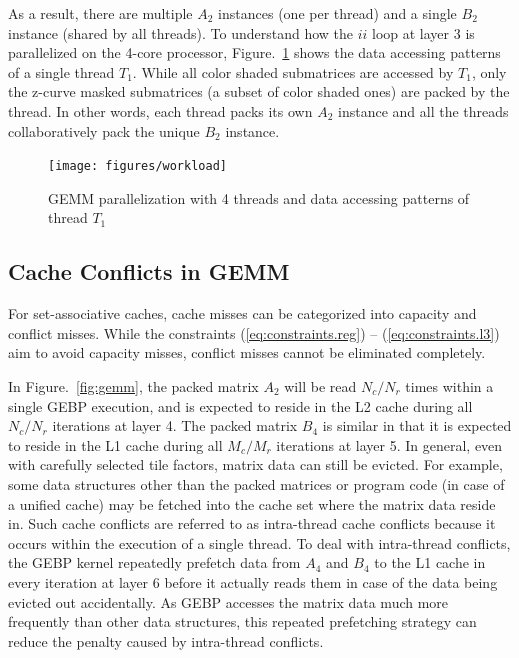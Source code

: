 As a result, there are multiple $A_2$ instances (one per thread)
and a single $B_2$ instance (shared by all threads).
To understand how the $ii$ loop at layer 3 is parallelized on the 4-core processor, 
Figure.~\ref{fig:workload} shows the data accessing patterns
of a single thread $T_1$.
While all color shaded submatrices are accessed by $T_1$,
only the z-curve masked submatrices (a subset of color shaded ones)
are packed by the thread.
In other words, each thread packs its own $A_2$ instance and  all the threads collaboratively pack the unique $B_2$ instance.

\begin{figure}[t]
  \centering
  \texttt{[image: figures/workload]}
  \caption{GEMM parallelization with 4 threads and data accessing patterns of thread $T_1$}
  \label{fig:workload}
\end{figure}

\subsection{Cache Conflicts in GEMM}\label{subsec:cache-conflicts}

For set-associative caches, cache misses can be categorized
into capacity and conflict misses.
While the constraints (\ref{eq:constraints.reg}) -- (\ref{eq:constraints.l3})
aim to avoid capacity misses,
conflict misses cannot be eliminated completely.

In Figure.~\ref{fig:gemm}, the packed matrix $A_2$
will be read $N_c/N_r$ times within a single GEBP execution,
and is expected to reside in the 
L2 cache during all $N_c/N_r$ iterations at layer 4.
The packed matrix $B_4$ is similar in that it is expected to
reside in the L1 cache during all $M_c/M_r$ iterations at layer 5.
In general, even with carefully selected tile factors,
matrix data can still be evicted.
For example, some data structures other than the packed matrices
or program code (in case of a unified cache) may be fetched into the
cache set where the matrix data reside in.
Such cache conflicts are referred to as
intra-thread cache conflicts
because it occurs within the execution of a single thread.
To deal with intra-thread conflicts,
the GEBP kernel repeatedly prefetch data from $A_4$ and $B_4$ to the L1 cache
in every iteration at layer 6 before it actually reads them in case of
the data being evicted out accidentally.
As GEBP accesses the matrix data much more frequently than other
data structures, this repeated prefetching strategy
can reduce the penalty caused by intra-thread conflicts.

